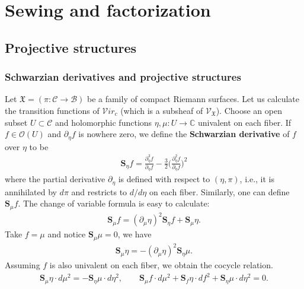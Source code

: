 \documentclass[12pt,b5paper,notitlepage]{report}
\theoremstyle{definition}
\theoremstyle{plain}
\newcommand{\fk}{\mathfrak}
\newcommand{\mc}{\mathcal}
\newcommand{\scr}{\mathscr}
\newcommand{\Cbb}{\mathbb C}
\newcommand{\svir}{\mathcal V\!\mathit{ir}}
\newcommand{\Sbf}{\mathbf{S}}
\numberwithin{equation}{section}
\begin{document}
\chapter{Sewing and factorization}





\section{Projective structures}




\subsection*{Schwarzian derivatives and projective structures}
Let $\fk X=(\pi:\mc C\rightarrow\mc B)$ be a family of compact Riemann surfaces. Let us calculate the transition functions of $\svir_c$ (which is a subsheaf of $\scr V_{\fk X}$). Choose an open subset $U\subset \mc C$ and holomorphic functions $\eta,\mu:U\rightarrow\Cbb$ univalent on each fiber. If $f\in\scr O(U)$ and $\partial_\eta f$ is nowhere zero, we define the \textbf{Schwarzian derivative} of $f$ over $\eta$ to be \index{S@$\Sbf_\eta f,\Sbf_\eta\fk P$}
\begin{align}
\Sbf_\eta f=\frac{\partial_\eta^3f}{\partial_\eta f}-\frac 32 \Big(\frac{\partial_\eta^2f}{\partial_\eta f} \Big)^2
\end{align}
where the partial derivative $\partial_\eta$ is defined with respect to $(\eta,\pi)$, i.e., it is annihilated by $d\pi$ and restricts to $d/d\eta$ on each fiber. Similarly, one can define $\Sbf_\mu f$. The change of variable formula is easy to calculate:
\begin{align}\label{eq166}
\Sbf_\mu f =(\partial_\mu\eta)^2 \Sbf_\eta f+\Sbf_\mu\eta.
\end{align}
Take $f=\mu$ and notice $\Sbf_\mu\mu=0$, we have
\begin{align}
\Sbf_\mu\eta=-(\partial_\mu\eta)^2\Sbf_\eta\mu.\label{eq167}
\end{align}
Assuming $f$ is also univalent on each fiber, we obtain the cocycle relation.
\begin{align}
\Sbf_\mu\eta\cdot d\mu^2=-\Sbf_\eta\mu\cdot d\eta^2,\qquad \Sbf_\mu f\cdot d\mu^2 + \Sbf_f \eta\cdot df^2+\Sbf_\eta\mu\cdot d\eta^2=0.\label{eq260}
\end{align}
\end{document}
